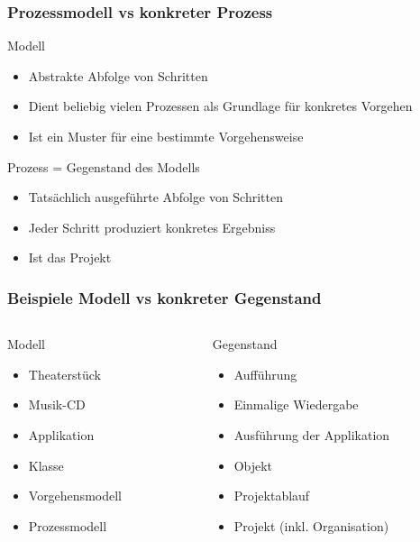 \begin{frame}
\frametitle{Prozessmodell vs konkreter Prozess}
	Modell
		\begin{itemize}
			\item Abstrakte Abfolge von Schritten
			\item Dient beliebig vielen Prozessen als Grundlage für konkretes Vorgehen
			\item Ist ein Muster für eine bestimmte Vorgehensweise
		\end{itemize}
	\bigskip
	Prozess = Gegenstand des Modells
		\begin{itemize}
			\item Tatsächlich ausgeführte Abfolge von Schritten
			\item Jeder Schritt produziert konkretes Ergebniss
			\item Ist das Projekt
		\end{itemize}
\end{frame}

\begin{frame}
\frametitle{Beispiele Modell vs konkreter Gegenstand}
	\begin{columns}
		\begin{column}{0.5\textwidth}
		Modell
			\small
			\begin{itemize}
				\item Theaterstück
				\item Musik-CD
				\item Applikation
				\item Klasse
				\item Vorgehensmodell
				\item Prozessmodell
			\end{itemize}
			\normalsize
		\end{column}
		\begin{column}{.5\textwidth}
		Gegenstand
			\small
			\begin{itemize}
				\item Aufführung
				\item Einmalige Wiedergabe
				\item Ausführung der Applikation
				\item Objekt
				\item Projektablauf
				\item Projekt (inkl. Organisation)
			\end{itemize}
			\normalsize
		\end{column}
	\end{columns}
\end{frame}

